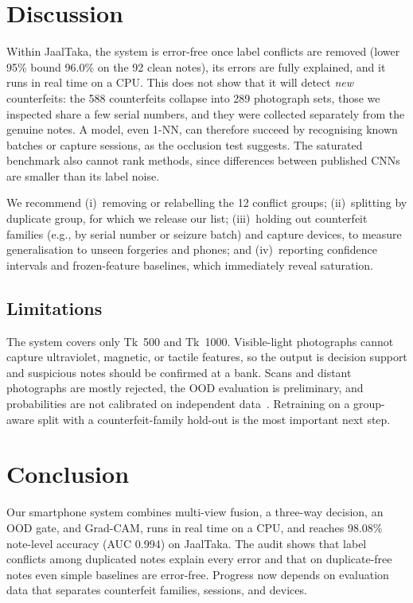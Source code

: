\documentclass[pdflatex,iicol,sn-mathphys-num]{sn-jnl}
\begin{document}
\section{Discussion}\label{sec:discussion}

Within JaalTaka, the system is error-free once label conflicts are removed (lower 95\%
bound 96.0\% on the 92 clean notes), its errors are fully explained, and it runs in real
time on a CPU. This does not show that it will detect \emph{new} counterfeits: the 588
counterfeits collapse into 289 photograph sets, those we inspected share a few serial
numbers, and they were collected separately from the genuine notes. A model, even 1-NN,
can therefore succeed by recognising known batches or capture sessions, as the occlusion
test suggests. The saturated benchmark also cannot rank methods, since differences
between published CNNs are smaller than its label noise.

We recommend (i)~removing or relabelling the 12 conflict groups; (ii)~splitting by
duplicate group, for which we release our list; (iii)~holding out counterfeit families
(e.g., by serial number or seizure batch) and capture devices, to measure generalisation
to unseen forgeries and phones; and (iv)~reporting confidence intervals and
frozen-feature baselines, which immediately reveal saturation.

\subsection{Limitations}\label{sec:limits}

The system covers only Tk~500 and Tk~1000. Visible-light photographs cannot capture
ultraviolet, magnetic, or tactile features, so the output is decision support and
suspicious notes should be confirmed at a bank. Scans and distant photographs are mostly
rejected, the OOD evaluation is preliminary, and probabilities are not calibrated on
independent data~\cite{guo2017calibration}. Retraining on a group-aware split with a
counterfeit-family hold-out is the most important next step.

\section{Conclusion}\label{sec:conclusion}

Our smartphone system combines multi-view fusion, a three-way decision, an OOD gate, and
Grad-CAM, runs in real time on a CPU, and reaches 98.08\% note-level accuracy (AUC
0.994) on JaalTaka. The audit shows that label conflicts among duplicated notes explain
every error and that on duplicate-free notes even simple baselines are error-free.
Progress now depends on evaluation data that separates counterfeit families, sessions,
and devices.
\end{document}
